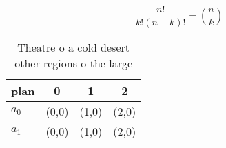 \documentclass[a4paper]{article}
\begin{document}
\[ \frac{n!}{k!(n-k)!} = \binom{n}{k} \]

\begin{table}
\begin{adjustbox}{width=0.6\columnwidth}
\begin{tabular}{|l|l|l|l|}
\hline
\textbf{plan} & \multicolumn{1}{c|}{\textbf{0}} & \multicolumn{1}{c|}{\textbf{1}} & \multicolumn{1}{c|}{\textbf{2}} \\ \hline
\textbf{$a_0$}  & (0,0) & (1,0) & (2,0) \\ \hline
\textbf{$a_1$}  & (0,0) & (1,0) & (2,0) \\ \hline
\end{tabular}
\end{adjustbox}
\caption{Theatre o a cold desert other regions o the large
}
\end{table}
\end{document}
